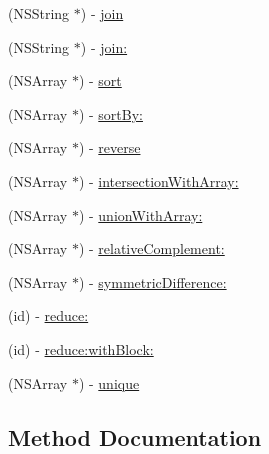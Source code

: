 \begin{DoxyCompactItemize}
\item 
(N\+S\+String $\ast$) -\/ \hyperlink{category_n_s_array_07_objective_sugar_08_a40cb53e3eac7319c14eb5c6ec72f68a9}{join}
\item 
(N\+S\+String $\ast$) -\/ \hyperlink{category_n_s_array_07_objective_sugar_08_ad1c01a876d26e873bd1c8ae65f6c873f}{join\+:}
\item 
(N\+S\+Array $\ast$) -\/ \hyperlink{category_n_s_array_07_objective_sugar_08_ae5c52811c31eb11892670f562c56682e}{sort}
\item 
(N\+S\+Array $\ast$) -\/ \hyperlink{category_n_s_array_07_objective_sugar_08_ac0f6524bfa844cbe4f0a75a2a9913d70}{sort\+By\+:}
\item 
(N\+S\+Array $\ast$) -\/ \hyperlink{category_n_s_array_07_objective_sugar_08_a488c5d864ef92eb138b196dfd736ed57}{reverse}
\item 
(N\+S\+Array $\ast$) -\/ \hyperlink{category_n_s_array_07_objective_sugar_08_adcdf343cabd8cbb23d7995589411f192}{intersection\+With\+Array\+:}
\item 
(N\+S\+Array $\ast$) -\/ \hyperlink{category_n_s_array_07_objective_sugar_08_a8d368c96862668ebce92ffee4a6329e5}{union\+With\+Array\+:}
\item 
(N\+S\+Array $\ast$) -\/ \hyperlink{category_n_s_array_07_objective_sugar_08_a00d586a342905227dda3afeac5581269}{relative\+Complement\+:}
\item 
(N\+S\+Array $\ast$) -\/ \hyperlink{category_n_s_array_07_objective_sugar_08_a18159a7f13d9693fff5727055da7fd51}{symmetric\+Difference\+:}
\item 
(id) -\/ \hyperlink{category_n_s_array_07_objective_sugar_08_a04d89d8dcf6c0ed668bac89968326af4}{reduce\+:}
\item 
(id) -\/ \hyperlink{category_n_s_array_07_objective_sugar_08_abaeb63c0daceff8126c0cc6ec09b33b3}{reduce\+:with\+Block\+:}
\item 
(N\+S\+Array $\ast$) -\/ \hyperlink{category_n_s_array_07_objective_sugar_08_a3448b01cd76b35d67eaa1030b4f5179a}{unique}
\end{DoxyCompactItemize}


\subsection{Method Documentation}
\hypertarget{category_n_s_array_07_objective_sugar_08_ae871866f8c83a707ca34c8a04242e566}{}
